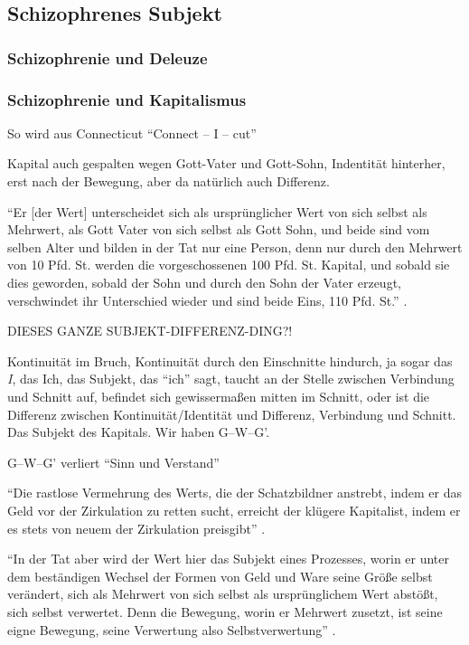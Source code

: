 \documentclass[12pt,
               DIV13,
               paper=a4,
               twoside=false,
               onehalfspacing,
               bibliography=totoc,
               toc=graduated,
               draft,
               ]{scrartcl}
\newcommand{\pc}[2]{\parencite[#1]{#2}}
\newcommand{\gwg}{G--W--G'\xspace}
\begin{document}
\subsection{Schizophrenes Subjekt}

\subsubsection{Schizophrenie und Deleuze}

\subsubsection{Schizophrenie und Kapitalismus}

So wird aus Connecticut "`Connect -- I -- cut"' \pc{48}{ao}

Kapital auch gespalten wegen Gott-Vater und Gott-Sohn, Indentität
hinterher, erst nach der Bewegung, aber da natürlich auch Differenz.

"`Er [der Wert] unterscheidet sich als ursprünglicher Wert von sich
selbst als Mehrwert, als Gott Vater von sich selbst als Gott Sohn, und
beide sind vom selben Alter und bilden in der Tat nur eine Person,
denn nur durch den Mehrwert von 10 Pfd. St. werden die vorgeschossenen
100 Pfd. St. Kapital, und sobald sie dies geworden, sobald der Sohn
und durch den Sohn der Vater erzeugt, verschwindet ihr Unterschied
wieder und sind beide Eins, 110 Pfd. St."' \pc{S. 169 f.}{kap}.

DIESES GANZE SUBJEKT-DIFFERENZ-DING?!

Kontinuität im Bruch, Kontinuität durch den Einschnitte hindurch, ja
sogar das \emph{I}, das Ich, das Subjekt, das "`ich"' sagt, taucht an
der Stelle zwischen Verbindung und Schnitt auf, befindet sich
gewissermaßen mitten im Schnitt, oder ist die Differenz zwischen
Kontinuität/Identität und Differenz, Verbindung und Schnitt. Das
Subjekt des Kapitals. Wir haben \gwg.

\gwg verliert "`Sinn und Verstand"' \pc{166}{kap}

"`Die rastlose Vermehrung des Werts, die der Schatzbildner anstrebt,
indem er das Geld vor der Zirkulation zu retten sucht, erreicht der
klügere Kapitalist, indem er es stets von neuem der Zirkulation
preisgibt"' \pc{168}{kap}.

"`In der Tat aber wird der Wert hier das Subjekt eines Prozesses,
worin er unter dem beständigen Wechsel der Formen von Geld und Ware
seine Größe selbst verändert, sich als Mehrwert von sich selbst als
ursprünglichem Wert abstößt, sich selbst verwertet. Denn die Bewegung,
worin er Mehrwert zusetzt, ist seine eigne Bewegung, seine Verwertung
also Selbstverwertung"' \pc{169}{kap}.
\end{document}
